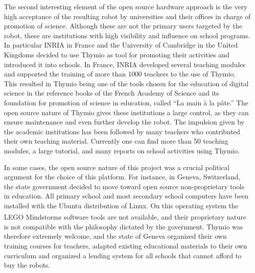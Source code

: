\documentclass[letterpaper, 10 pt, conference]{ieeeconf}  %
\begin{document}
The second interesting element of the open source hardware approach is the very high acceptance of the resulting robot by universities and their offices in charge of promotion of science.
Although these are not the primary users targeted by the robot, these are institutions with high visibility and influence on school programs. 
In particular INRIA in France and the University of Cambridge in the United Kingdoms decided to use Thymio as tool for promoting their activities and introduced it into schools.
In France, INRIA developed several teaching modules and supported the training of more than 1000 teachers to the use of Thymio. 
This resulted in Thymio being one of the tools chosen for the education of digital science in the reference books of the French Academy of Science and its foundation for promotion of science in education, called ``La main \`a la p\^ate.''
The open source nature of Thymio gives these institutions a large control, as they can ensure maintenance and even further develop the robot.
The impulsion given by the academic institutions has been followed by many teachers who contributed their own teaching material. 
Currently one can find more than 50 teaching modules, a large tutorial, and many reports on school activities using Thymio. 

In some cases, the open source nature of this project was a crucial political argument for the choice of this platform.
For instance, in Geneva, Switzerland, the state government decided to move toward open source non-proprietary tools in education.
All primary school and most secondary school computers have been installed with the Ubuntu distribution of Linux. 
On this operating system the LEGO\textsuperscript{\textregistered} Mindstorms\textsuperscript{\textregistered} software tools are not available, and their proprietary nature is not compatible with the philosophy dictated by the government. 
Thymio was therefore extremely welcome, and the state of Geneva organized their own training courses for teachers, adapted existing educational materials to their own curriculum and organized a lending system for all schools that cannot afford to buy the robots.

\end{document}
